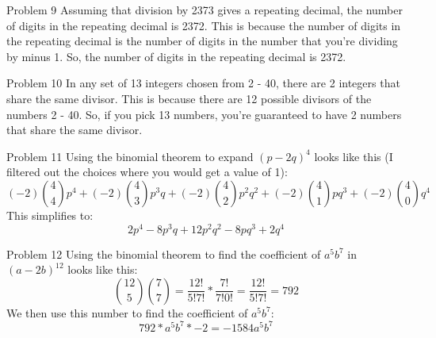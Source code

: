 \documentclass[12pt]{article}
\begin{document}
    \begin{problem}{Problem 9}
        Assuming that division by 2373 gives a repeating decimal, the number of digits in the repeating decimal is 2372.
        This is because the number of digits in the repeating decimal is the number of digits in the number that you're
        dividing by minus 1. So, the number of digits in the repeating decimal is 2372.
    \end{problem}

    \begin{problem}{Problem 10}
        In any set of 13 integers chosen from 2 - 40, there are 2 integers that share the same divisor. This is because
        there are 12 possible divisors of the numbers 2 - 40. So, if you pick 13 numbers, you're guaranteed to have 2
        numbers that share the same divisor.
    \end{problem}

    \begin{problem}{Problem 11}
        Using the binomial theorem to expand $(p - 2q)^4$ looks like this (I filtered out the choices where you would get a value of 1):
        \[(-2)\binom{4}{4}p^4 + (-2)\binom{4}{3}p^3q + (-2)\binom{4}{2}p^2q^2 + (-2)\binom{4}{1}pq^3 + (-2)\binom{4}{0}q^4\]
        This simplifies to:
        \[2p^4 - 8p^3q + 12p^2q^2 - 8pq^3 + 2q^4\]
    \end{problem}

    \begin{problem}{Problem 12}
        Using the binomial theorem to find the coefficient of $a^5b^7$ in $(a - 2b)^{12}$ looks like this:
        \[\binom{12}{5}\binom{7}{7} = \frac{12!}{5!7!} * \frac{7!}{7!0!} = \frac{12!}{5!7!} = 792\]
        We then use this number to find the coefficient of $a^5b^7$:
        \[792 * a^5b^7 * -2 = -1584a^5b^7\]
    \end{problem}
        
\end{document}
